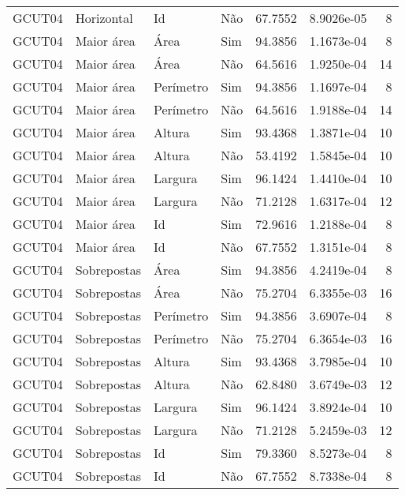 \begin{tabular}{llllrrr}
GCUT04    & Horizontal  & Id        & Não         & 67.7552      & 8.9026e-05 & 8        \\
GCUT04    & Maior área  & Área      & Sim         & 94.3856      & 1.1673e-04 & 8        \\
GCUT04    & Maior área  & Área      & Não         & 64.5616      & 1.9250e-04 & 14       \\
GCUT04    & Maior área  & Perímetro & Sim         & 94.3856      & 1.1697e-04 & 8        \\
GCUT04    & Maior área  & Perímetro & Não         & 64.5616      & 1.9188e-04 & 14       \\
GCUT04    & Maior área  & Altura    & Sim         & 93.4368      & 1.3871e-04 & 10       \\
GCUT04    & Maior área  & Altura    & Não         & 53.4192      & 1.5845e-04 & 10       \\
GCUT04    & Maior área  & Largura   & Sim         & 96.1424      & 1.4410e-04 & 10       \\
GCUT04    & Maior área  & Largura   & Não         & 71.2128      & 1.6317e-04 & 12       \\
GCUT04    & Maior área  & Id        & Sim         & 72.9616      & 1.2188e-04 & 8        \\
GCUT04    & Maior área  & Id        & Não         & 67.7552      & 1.3151e-04 & 8        \\
GCUT04    & Sobrepostas & Área      & Sim         & 94.3856      & 4.2419e-04 & 8        \\
GCUT04    & Sobrepostas & Área      & Não         & 75.2704      & 6.3355e-03 & 16       \\
GCUT04    & Sobrepostas & Perímetro & Sim         & 94.3856      & 3.6907e-04 & 8        \\
GCUT04    & Sobrepostas & Perímetro & Não         & 75.2704      & 6.3654e-03 & 16       \\
GCUT04    & Sobrepostas & Altura    & Sim         & 93.4368      & 3.7985e-04 & 10       \\
GCUT04    & Sobrepostas & Altura    & Não         & 62.8480      & 3.6749e-03 & 12       \\
GCUT04    & Sobrepostas & Largura   & Sim         & 96.1424      & 3.8924e-04 & 10       \\
GCUT04    & Sobrepostas & Largura   & Não         & 71.2128      & 5.2459e-03 & 12       \\
GCUT04    & Sobrepostas & Id        & Sim         & 79.3360      & 8.5273e-04 & 8        \\
GCUT04    & Sobrepostas & Id        & Não         & 67.7552      & 8.7338e-04 & 8        \\
\hline
\end{tabular}